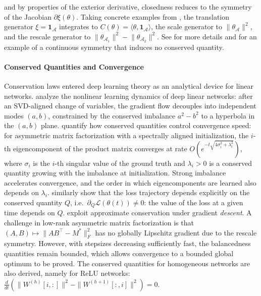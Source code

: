 \documentclass[mathematics,review,submit,moreauthors]{Definitions/mdpi}
\begin{document}
and by properties of the exterior derivative, closedness reduces to the symmetry of the Jacobian $\partial\xi(\theta)$.
Taking concrete examples from \citep{kunin2020}, the translation generator $\xi=\boldsymbol{1}_{\mathcal{A}}$ integrates to $C(\theta)=\langle\theta,\boldsymbol{1}_{\mathcal{A}}\rangle$, the scale generator to $\lVert\theta_{\mathcal{A}}\rVert^2$, and the rescale generator to $\lVert\theta_{\mathcal{A}_1}\rVert^2-\lVert\theta_{\mathcal{A}_2}\rVert^2$.
See \citep{kunin2020,zhao2023a,marcotte2023,ziyin2024a} for more details and \citet[Prop.~52]{gegenfurtner2026} for an example of a continuous symmetry that induces no conserved quantity.

\paragraph{Conserved Quantities and Convergence}
Conservation laws entered deep learning theory as an analytical device for linear networks.
\citet{saxe2014piclr2} analyze the nonlinear learning dynamics of deep linear networks: after an SVD-aligned change of variables, the gradient flow decouples into independent modes $(a,b)$, constrained by the conserved imbalance $a^2-b^2$ to a hyperbola in the $(a,b)$ plane.
\citet{tarmoun2021p3icml} quantify how conserved quantities control convergence speed: for asymmetric matrix factorization with a spectrally aligned initialization, the $i$-th eigencomponent of the product matrix converges at rate $O(e^{-t\sqrt{4\sigma_i^2+\lambda_i^2}})$, where $\sigma_i$ is the $i$-th singular value of the ground truth and $\lambda_i>0$ is a conserved quantity growing with the imbalance at initialization.
Strong imbalance accelerates convergence, and the order in which eigencomponents are learned also depends on $\lambda_i$.
\citet{zhao2023a} similarly show that the loss trajectory depends explicitly on the conserved quantity $Q$, i.e.\ $\partial_Q\mathcal{L}(\theta(t))\neq0$: the value of the loss at a given time depends on $Q$.
\citet{du2018anips} exploit approximate conservation under gradient \emph{descent}.
A challenge in low-rank asymmetric matrix factorization is that $(A,B) \mapsto \lVert AB^\top-M^*\rVert_F^2$ has no globally Lipschitz gradient due to the rescale symmetry.
However, with stepsizes decreasing sufficiently fast, the balancedness quantities remain bounded, which allows convergence to a bounded global optimum to be proved.
The conserved quantities for homogeneous networks are also derived, namely for ReLU networks: $\frac{d}{dt} \left( \|W^{(h)}[i, :]\|^2 - \|W^{(h+1)}[:, i]\|^2 \right) = 0$.
\end{document}
